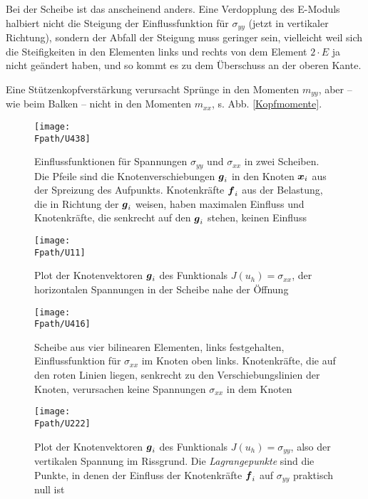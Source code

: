{{{Bei der Scheibe ist das anscheinend anders. Eine Verdopplung des E-Moduls halbiert nicht die Steigung der Einflussfunktion f\"{u}r $\sigma_{yy}$ (jetzt in vertikaler Richtung), sondern der Abfall der Steigung muss geringer sein, vielleicht weil sich die Steifigkeiten in den Elementen links und rechts von dem Element $2\cdot E$ ja nicht ge\"{a}ndert haben, und so kommt es zu dem \glq \"{U}berschuss\grq{} an der oberen Kante.

Eine St\"{u}tzenkopfverst\"{a}rkung verursacht Spr\"{u}nge in den Momenten $m_{yy}$, aber -- wie beim
Balken -- nicht in den Momenten $m_{xx}$, s. Abb. \ref{Kopfmomente}.


\begin{figure}
\centering
{\texttt{[image: \\Fpath/U438]}}
  \caption{Einflussfunktionen f\"{u}r Spannungen $\sigma_{yy}$ und $\sigma_{xx}$ in zwei Scheiben. Die Pfeile sind die Knotenverschiebungen $\mbox{\boldmath $g$}_i$ in den Knoten $\mbox{\boldmath $x$}_i$ aus der Spreizung des Aufpunkts. Knotenkr\"{a}fte $\mbox{\boldmath $f$}_i$ aus der Belastung, die in Richtung der $\mbox{\boldmath $g$}_i$ weisen, haben maximalen Einfluss und Knotenkr\"{a}fte, die senkrecht auf den $\mbox{\boldmath $g$}_i$ stehen, keinen Einfluss}  \label{U438}\label{Korrektur21}
\end{figure}
\begin{figure}
\centering
{\texttt{[image: \\Fpath/U11]}}
  \caption{ Plot der Knotenvektoren $\mbox{\boldmath $g$}_i$ des Funktionals $J(u_h) = \sigma_{xx}$, der horizontalen Spannungen in der Scheibe nahe der \"{O}ffnung}
  \label{U11}
\end{figure}%
\begin{figure}
\centering
{\texttt{[image: \\Fpath/U416]}}  %
  \caption{Scheibe aus vier bilinearen Elementen, links festgehalten, Einflussfunktion f\"{u}r $\sigma_{xx}$ im Knoten oben links. Knotenkr\"{a}fte, die auf den roten Linien liegen, senkrecht zu den Verschiebungslinien der Knoten, verursachen keine Spannungen $\sigma_{xx}$ in dem Knoten}
  \label{U416}
\end{figure}%
\begin{figure}
\centering
{\texttt{[image: \\Fpath/U222]}}
  \caption{Plot der Knotenvektoren $\mbox{\boldmath $g$}_i$ des Funktionals $J(u_h) = \sigma_{yy}$, also der vertikalen Spannung im Rissgrund. Die {\em Lagrangepunkte\/} sind die Punkte, in denen der Einfluss der Knotenkr\"{a}fte $\mbox{\boldmath $f$}_i$ auf $\sigma_{yy}$ praktisch null ist}
  \label{U222}
\end{figure}%

}}}

